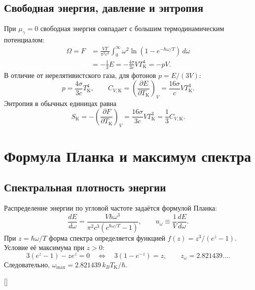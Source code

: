 \documentclass[../final.tex]{subfiles}
\begin{document}
\subsection{Свободная энергия, давление и энтропия}
При $\mu_\gamma=0$ свободная энергия совпадает с большим
термодинамическим потенциалом:
\begin{align*}
 \Omega=F&=\frac{VT}{\pi^2c^3}\int_0^\infty
 \omega^2\ln(1-e^{-\hbar\omega/T})\,d\omega\\
 &=-\frac13E=-\frac{4\sigma}{3c}VT_{\mathrm K}^4=-pV.
\end{align*}
В отличие от нерелятивистского газа, для фотонов $p=E/(3V)$:
\begin{equation*}
 p=\frac{4\sigma}{3c}T_{\mathrm K}^4,\qquad
 C_{V,\mathrm K}=\left(\frac{\partial E}{\partial T_{\mathrm K}}\right)_V
 =\frac{16\sigma}{c}VT_{\mathrm K}^3.
\end{equation*}
Энтропия в обычных единицах равна
\begin{equation*}
 S_{\mathrm K}=-\left(\frac{\partial F}{\partial T_{\mathrm K}}\right)_V
 =\frac{16\sigma}{3c}VT_{\mathrm K}^3=\frac13C_{V,\mathrm K}.
\end{equation*}

\clearpage
\section{Формула Планка и максимум спектра}
\subsection{Спектральная плотность энергии}
Распределение энергии по угловой частоте задаётся формулой Планка:
\begin{equation*}
 \frac{dE}{d\omega}=
 \frac{V\hbar\omega^3}{\pi^2c^3(e^{\hbar\omega/T}-1)},\qquad
 u_\omega\equiv\frac1V\frac{dE}{d\omega}.
\end{equation*}
При $z=\hbar\omega/T$ форма спектра определяется функцией
$f(z)=z^3/(e^z-1)$. Условие её максимума при $z>0$:
\begin{equation*}
 3(e^z-1)-ze^z=0\quad\Longleftrightarrow\quad
 3(1-e^{-z})=z,\qquad z_\omega=2.821439\ldots.
\end{equation*}
Следовательно, $\omega_{\max}=2.821439\,k_BT_{\mathrm K}/\hbar$.

\begin{rbox}[unbreakable,left=14pt,right=14pt,top=10pt,bottom=7pt]{[]}
\centering
\captionsetup{font=footnotesize,hypcap=false,skip=5pt}
\end{rbox}
\end{document}
